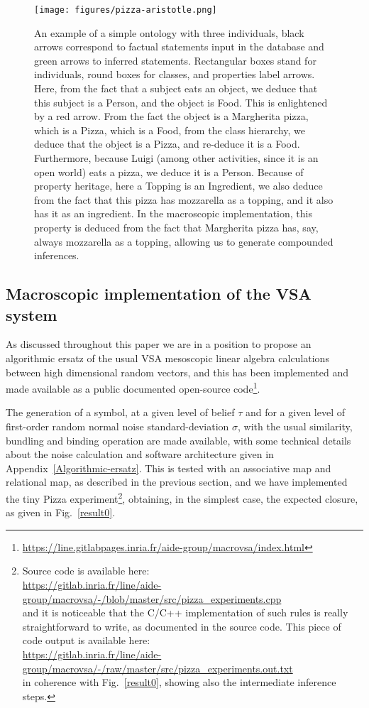 \documentclass[sn-mathphys]{sn-jnl}
\newcommand{\hhref}[1]{\href{#1}{#1}}
\begin{document}
\begin{figure}[htbp]
\centerline{\texttt{[image: figures/pizza-aristotle.png]}}
\caption{An example of a simple ontology with three individuals, black arrows correspond to factual statements input in the database and green arrows to inferred statements. Rectangular boxes stand for individuals, round boxes for classes, and properties label arrows. Here, from the fact that a subject eats an object, we deduce that this subject is a Person, and the object is Food. This is enlightened by a red arrow. From the fact the object is a Margherita pizza, which is a Pizza, which is a Food, from the class hierarchy, we deduce that the object is a Pizza, and re-deduce it is a Food. Furthermore, because Luigi (among other activities, since it is an open world) eats a pizza, we deduce it is a Person. Because of property heritage, here a Topping is an Ingredient, we also deduce from the fact that this pizza has mozzarella as a topping, and it also has it as an ingredient. In the macroscopic implementation, this property is deduced from the fact that Margherita pizza has, say, always mozzarella as a topping, allowing us to generate compounded inferences.}
\label{Pizza}
\end{figure}

\subsection{Macroscopic implementation of the VSA system}\label{macrovsa}

As discussed throughout this paper we are in a position to propose an algorithmic ersatz of the usual VSA mesoscopic linear algebra calculations between high dimensional random vectors, and this has been implemented and made available as a public documented open-source code\footnote{\hhref{https://line.gitlabpages.inria.fr/aide-group/macrovsa/index.html}}.

The generation of a symbol, at a given level of belief $\tau$ and for a given level of first-order random normal noise standard-deviation $\sigma$, with the usual similarity, bundling and binding operation are made available, with some technical details about the noise calculation and software architecture given in Appendix~\ref{Algorithmic-ersatz}. This is tested with an associative map and relational map, as described in the previous section, and we have implemented the tiny Pizza experiment\footnote{Source code is available here: \\ \hhref{https://gitlab.inria.fr/line/aide-group/macrovsa/-/blob/master/src/pizza_experiments.cpp} \\ and it is noticeable that the C/C++ implementation of such rules is really straightforward to write, as documented in the source code. This piece of code output is available here: \\ \hhref{https://gitlab.inria.fr/line/aide-group/macrovsa/-/raw/master/src/pizza_experiments.out.txt} \\ in coherence with Fig.~\ref{result0}, showing also the intermediate inference steps.}, obtaining, in the simplest case, the expected closure, as given in Fig.~\ref{result0}.
\end{document}
